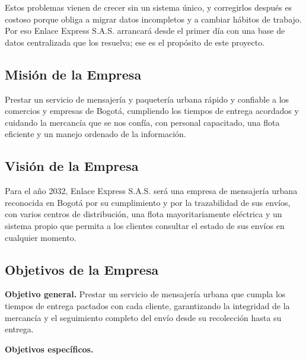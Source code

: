 Estos problemas vienen de crecer sin un sistema único, y corregirlos
después es costoso porque obliga a migrar datos incompletos y a cambiar
hábitos de trabajo. Por eso Enlace Express S.A.S. arrancará desde el
primer día con una base de datos centralizada que los resuelva; ese es
el propósito de este proyecto.

\subsection{Misión de la Empresa}

Prestar un servicio de mensajería y paquetería urbana rápido y confiable
a los comercios y empresas de Bogotá, cumpliendo los tiempos de entrega
acordados y cuidando la mercancía que se nos confía, con personal
capacitado, una flota eficiente y un manejo ordenado de la información.

\subsection{Visión de la Empresa}

Para el año 2032, Enlace Express S.A.S. será una empresa de mensajería
urbana reconocida en Bogotá por su cumplimiento y por la trazabilidad de
sus envíos, con varios centros de distribución, una flota
mayoritariamente eléctrica y un sistema propio que permita a los
clientes consultar el estado de sus envíos en cualquier momento.

\subsection{Objetivos de la Empresa}

\textbf{Objetivo general.} Prestar un servicio de mensajería urbana que
cumpla los tiempos de entrega pactados con cada cliente, garantizando la
integridad de la mercancía y el seguimiento completo del envío desde su
recolección hasta su entrega.

\textbf{Objetivos específicos.}

